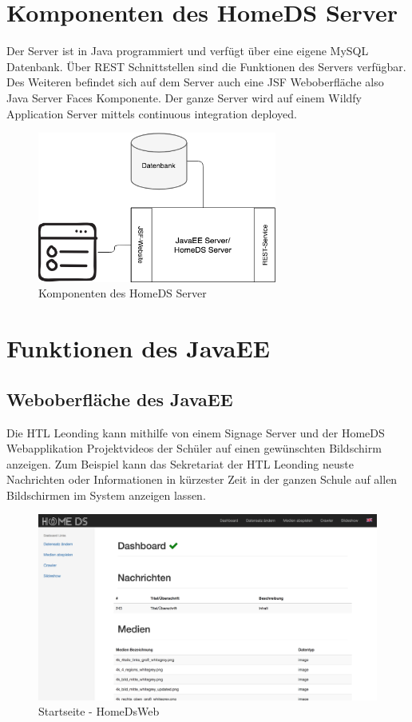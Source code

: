 \section{Komponenten des HomeDS Server}\label{sec:homedscomponents}
Der Server ist in Java programmiert und verfügt über eine eigene MySQL Datenbank. Über REST Schnittstellen sind die Funktionen des Servers verfügbar. Des Weiteren befindet sich auf dem Server auch eine JSF Weboberfläche also Java Server Faces Komponente. Der ganze Server wird auf einem Wildfy Application Server mittels continuous integration deployed.
\begin{figure}[H]
\centering
\includegraphics[width=0.7\textwidth]{images/08_HomeDsWeb/components.png}
\caption{Komponenten des HomeDS Server}
\label{img:components}
\end{figure}
 
\section{Funktionen des JavaEE}
\subsection{Weboberfläche des JavaEE}\label{sec:javaeejsfweb}
Die HTL Leonding kann mithilfe von einem Signage Server und der HomeDS Webapplikation Projektvideos der Schüler auf einen gewünschten Bildschirm anzeigen.  Zum Beispiel kann das Sekretariat der HTL Leonding neuste Nachrichten oder Informationen in kürzester Zeit in der ganzen Schule auf allen Bildschirmen im System anzeigen lassen.
\begin{figure}[H]
\centering
\includegraphics[width=1\textwidth]{images/08_HomeDsWeb/DashboardHomeDsWeb.png}
\caption{Startseite - HomeDsWeb}
\label{img:Startseite}
\end{figure}

